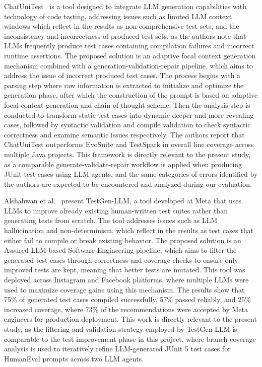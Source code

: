 \documentclass[journal]{IEEEtran}
\begin{document}
ChatUniTest~\cite{chatunitest} is a tool designed to integrate LLM generation capabilities with technology of code testing, addressing issues such as limited LLM context windows which reflect in the results as non-comprehensive test sets, and the inconsistency and incorrectness of produced test sets, as the authors note that LLMs frequently produce test cases containing compilation failures and incorrect runtime assertions. The proposed solution is an adaptive focal context generation mechanism combined with a generation-validation-repair pipeline, which aims to address the issue of incorrect produced test cases. The process begins with a parsing step where raw information is extracted to initialize and optimize the generation phase, after which the construction of the prompt is based on adaptive focal context generation and chain-of-thought scheme. Then the analysis step is conducted to transform static test cases into dynamic deeper and more revealing cases, followed by syntactic validation and compile validation to check syntactic correctness and examine semantic issues respectively. The authors report that ChatUniTest outperforms EvoSuite and TestSpark in overall line coverage across multiple Java projects. This framework is directly relevant to the present study, as a comparable generate-validate-repair workflow is applied when producing JUnit test cases using LLM agents, and the same categories of errors identified by the authors are expected to be encountered and analyzed during our evaluation.

Alshahwan et al.~\cite{testgenllm} present TestGen-LLM, a tool developed at Meta that uses LLMs to improve already existing human-written test suites rather than generating tests from scratch. The tool addresses issues such as LLM hallucination and non-determinism, which reflect in the results as test cases that either fail to compile or break existing behavior. The proposed solution is an Assured LLM-based Software Engineering pipeline, which aims to filter the generated test cases through correctness and coverage checks to ensure only improved tests are kept, meaning that better tests are mutated. This tool was deployed across Instagram and Facebook platforms, where multiple LLMs were used to maximize coverage gains using this mechanism. The results show that 75\% of generated test cases compiled successfully, 57\% passed reliably, and 25\% increased coverage, where 73\% of the recommendations were accepted by Meta engineers for production deployment. This work is directly relevant to the present study, as the filtering and validation strategy employed by TestGen-LLM is comparable to the test improvement phase in this project, where branch coverage analysis is used to iteratively refine LLM-generated JUnit 5 test cases for HumanEval prompts across two LLM agents.
\end{document}
